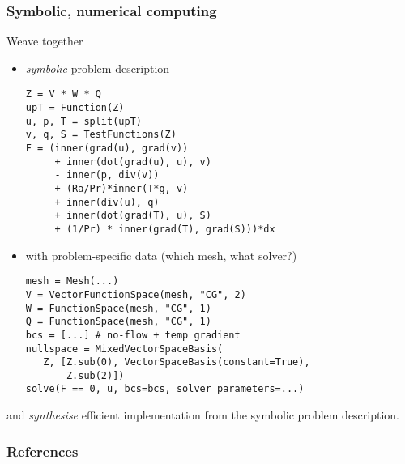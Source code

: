 \documentclass[presentation]{beamer}
\begin{document}
\begin{frame}[fragile]
  \frametitle{Symbolic, numerical computing}
  Weave together
  \begin{itemize}
  \item \emph{symbolic} problem description
\begin{verbatim}
Z = V * W * Q
upT = Function(Z)
u, p, T = split(upT)
v, q, S = TestFunctions(Z)
F = (inner(grad(u), grad(v))
     + inner(dot(grad(u), u), v)
     - inner(p, div(v))
     + (Ra/Pr)*inner(T*g, v)
     + inner(div(u), q)
     + inner(dot(grad(T), u), S)
     + (1/Pr) * inner(grad(T), grad(S)))*dx
\end{verbatim}
  \item with problem-specific data (which mesh, what solver?)
\begin{verbatim}
mesh = Mesh(...)
V = VectorFunctionSpace(mesh, "CG", 2)
W = FunctionSpace(mesh, "CG", 1)
Q = FunctionSpace(mesh, "CG", 1)
bcs = [...] # no-flow + temp gradient
nullspace = MixedVectorSpaceBasis(
   Z, [Z.sub(0), VectorSpaceBasis(constant=True), 
       Z.sub(2)])
solve(F == 0, u, bcs=bcs, solver_parameters=...)
\end{verbatim}
  \end{itemize}
  and \emph{synthesise} efficient implementation from
  the symbolic problem description.
\end{frame}

\appendix
\begin{frame}[t]
  \frametitle{References}
  \printbibliography[heading=none]
\end{frame}
\end{document}
